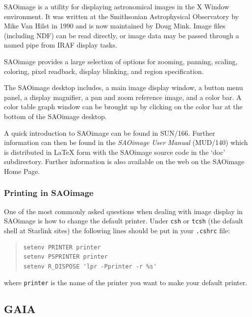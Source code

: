 \documentclass[twoside,11pt]{article}
\newcommand{\htmladdnormallink}[2]{#1}
\newcommand{\xref}[3]{#1}
\newcommand{\xlabel}[1]{}
\begin{document}
\htmladdnormallink{SAOimage}{http://tdc-www.harvard.edu/software/saoimage.html} is a utility for displaying astronomical images in the X Window environment. It was written at the Smithsonian Astrophysical Observatory by Mike Van Hilst in 1990 and is now maintained by Doug Mink. Image files (including \xref{NDF}{sun33}{}) can be read directly, or image data may be passed through a named pipe from IRAF display tasks. 

SAOimage provides a large selection of options for zooming, panning, scaling, coloring, pixel readback, display blinking, and region specification. 

The SAOimage desktop includes, a main image display window, a button menu panel, a display magnifier, a pan and zoom reference image, and a color bar. A color table graph window can be brought up by clicking on the color bar at the bottom of the SAOimage desktop.

A quick introduction to SAOimage can be found in \xref{SUN/166}{sun166}{}. Further information can then be found in the {\em SAOimage User Manual} (MUD/140) which is distributed in LaTeX form with the SAOimage source code in the `doc' subdirectory. Further information is also available on the web on the \htmladdnormallink{SAOimage Home Page}{http://tdc-www.harvard.edu/software/saoimage.html}.

\subsubsection{Printing in SAOimage}

One of the most commonly asked questions when dealing with image display in SAOimage is how to change the default printer. Under {\tt csh} or {\tt tcsh} (the default shell at Starlink sites) the following lines should be put in your {\tt .cshrc} file:

\small
\begin{quote}
\begin{verbatim}
setenv PRINTER printer
setenv PSPRINTER printer
setenv R_DISPOSE 'lpr -Pprinter -r %s'
\end{verbatim}
\end{quote}
\normalsize

where \verb+printer+ is the name of the printer you want to make your default printer.

\subsection{\xlabel{sc15_gaia}GAIA\label{sc15_gaia}}
\end{document}
